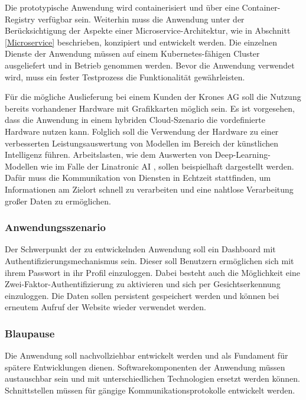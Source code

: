 Die prototypische Anwendung wird containerisiert und über eine Container-Registry verfügbar sein. 
Weiterhin muss die Anwendung unter der Berücksichtigung der Aspekte einer Microservice-Architektur, wie in Abschnitt \ref{Microservice} beschrieben, konzipiert und entwickelt werden. 
Die einzelnen Dienste der Anwendung müssen auf einem Kubernetes-fähigen Cluster ausgeliefert und in Betrieb genommen werden.
Bevor die Anwendung verwendet wird, muss ein fester Testprozess die Funktionalität gewährleisten.

Für die mögliche Auslieferung bei einem Kunden der Krones AG soll die Nutzung bereits vorhandener Hardware mit Grafikkarten möglich sein. 
Es ist vorgesehen, dass die Anwendung in einem hybriden Cloud-Szenario die vordefinierte Hardware nutzen kann. Folglich soll die Verwendung der Hardware zu einer verbesserten Leistungsauswertung von Modellen im Bereich der künstlichen Intelligenz führen. 
Arbeitslasten, wie dem Auswerten von Deep-Learning-Modellen wie im Falle der Linatronic AI \cite{linatronic}, sollen beispielhaft dargestellt werden. 
Dafür muss die Kommunikation von Diensten in Echtzeit stattfinden, um Informationen am Zielort schnell zu verarbeiten und eine nahtlose Verarbeitung großer Daten zu ermöglichen.

\subsubsection{Anwendungsszenario}\label{Anwendungsszenario}

Der Schwerpunkt der zu entwickelnden Anwendung soll ein Dashboard mit Authentifizierungsmechanismus sein. 
Dieser soll Benutzern ermöglichen sich mit ihrem Passwort in ihr Profil einzuloggen. 
Dabei besteht auch die Möglichkeit eine Zwei-Faktor-Authentifizierung zu aktivieren und sich per Gesichtserkennung einzuloggen.
Die Daten sollen persistent gespeichert werden und können bei erneutem Aufruf der Website wieder verwendet werden. 

\subsubsection{Blaupause}

Die Anwendung soll nachvollziehbar entwickelt werden und als Fundament für spätere Entwicklungen dienen.
Softwarekomponenten der Anwendung müssen austauschbar sein und mit unterschiedlichen Technologien ersetzt werden können.
Schnittstellen müssen für gängige Kommunikationsprotokolle entwickelt werden.

